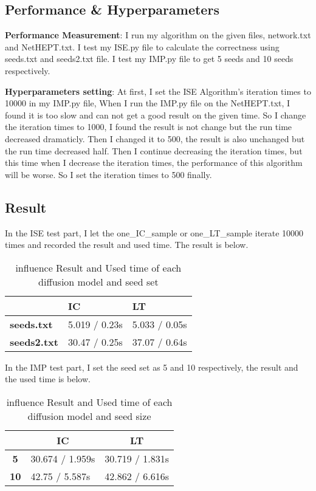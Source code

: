 \documentclass[conference,compsoc]{IEEEtran}
\begin{document}
\subsection{Performance \& Hyperparameters}
\textbf{Performance Measurement}: I run my algorithm on the given files, network.txt and NetHEPT.txt. I test my ISE.py file to calculate the correctness using seeds.txt and seeds2.txt file. I test my IMP.py file to get 5 seeds and 10 seeds respectively.\par
\textbf{Hyperparameters setting}: At first, I set the ISE Algorithm's iteration times to 10000 in my IMP.py file, When I run the IMP.py file on the NetHEPT.txt, I found it is too slow and can not get a good result on the given time. So I change the iteration times to 1000, I found the result is not change but the run time decreased dramaticly. Then I changed it to 500, the result is also unchanged but the run time decreased half. Then I continue decreasing the iteration times, but this time when I decrease the iteration times, the performance of this algorithm will be worse. So I set the iteration times to 500 finally.


\subsection{Result}
In the ISE test part, I let the one\_{IC\_{sample}} or one\_{LT\_{sample}} iterate 10000 times and recorded the result and used time. The result is below.

\begin{table}[htb]
\centering
\begin{tabular}{@{}lll@{}}
\toprule
 & \textbf{IC} & \textbf{LT} \\ \midrule
\textbf{seeds.txt} & 5.019 / 0.23s & 5.033 / 0.05s \\
\textbf{seeds2.txt} & 30.47 / 0.25s & 37.07 / 0.64s \\ \bottomrule
\end{tabular}
\caption{influence Result and Used time of each diffusion model and seed set }
\label{my-label}
\end{table}

In the IMP test part, I set the seed set as 5 and 10 respectively, the result and the used time is below.

\begin{table}[htb]
\centering
\begin{tabular}{@{}cll@{}}
\toprule
\multicolumn{1}{l}{} & \multicolumn{1}{c}{\textbf{IC}} & \multicolumn{1}{c}{\textbf{LT}} \\ \midrule
\textbf{5} & 30.674 / 1.959s & 30.719 / 1.831s \\
\textbf{10} & 42.75 / 5.587s & 42.862 / 6.616s \\ \bottomrule
\end{tabular}
\caption{influence Result and Used time of each diffusion model and seed size}
\label{my-label}
\end{table}
\end{document}
